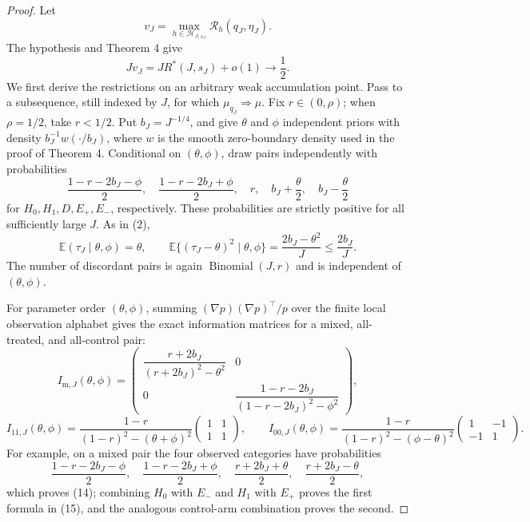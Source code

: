 \documentclass{article}
\begin{document}
\begin{proof}
Let
\[
 v_J=\max_{h\in\mathcal H_{J,s_J}}\mathcal R_h(q_J,\eta_J).
\]
The hypothesis and Theorem 4 give
\[
 Jv_J=J R^*(J,s_J)+o(1)\longrightarrow\frac12.
 \tag{11}
\]
We first derive the restrictions on an arbitrary weak accumulation point.  Pass to a subsequence, still indexed by \(J\), for which \(\mu_{q_J}\Rightarrow\mu\).  Fix \(r\in(0,\rho)\); when \(\rho=1/2\), take \(r<1/2\).  Put \(b_J=J^{-1/4}\), and give \(\theta\) and \(\phi\) independent priors with density \(b_J^{-1}w(\cdot/b_J)\), where \(w\) is the smooth zero-boundary density used in the proof of Theorem 4.  Conditional on \((\theta,\phi)\), draw pairs independently with probabilities
\[
 \frac{1-r-2b_J-\phi}{2},\quad
 \frac{1-r-2b_J+\phi}{2},\quad
 r,\quad
 b_J+\frac\theta2,\quad
 b_J-\frac\theta2
 \tag{12}
\]
for \(H_0,H_1,D,E_+,E_-\), respectively.  These probabilities are strictly positive for all sufficiently large \(J\).  As in (2),
\[
 \mathbb E(\tau_J\mid\theta,\phi)=\theta,
 \qquad
 \mathbb E\{(\tau_J-\theta)^2\mid\theta,\phi\}
 =\frac{2b_J-\theta^2}{J}\le\frac{2b_J}{J}.
 \tag{13}
\]
The number of discordant pairs is again \(\operatorname{Binomial}(J,r)\) and is independent of \((\theta,\phi)\).

For parameter order \((\theta,\phi)\), summing \((\nabla p)(\nabla p)^{\!\top}/p\) over the finite local observation alphabet gives the exact information matrices for a mixed, all-treated, and all-control pair:
\[
 I_{\mathrm m,J}(\theta,\phi)=
 \begin{pmatrix}
 \dfrac{r+2b_J}{(r+2b_J)^2-\theta^2}&0\\[5pt]
 0&\dfrac{1-r-2b_J}{(1-r-2b_J)^2-\phi^2}
 \end{pmatrix},
 \tag{14}
\]
\[
 I_{11,J}(\theta,\phi)=
 \frac{1-r}{(1-r)^2-(\theta+\phi)^2}
 \begin{pmatrix}1&1\\1&1\end{pmatrix},
 \qquad
 I_{00,J}(\theta,\phi)=
 \frac{1-r}{(1-r)^2-(\phi-\theta)^2}
 \begin{pmatrix}1&-1\\-1&1\end{pmatrix}.
 \tag{15}
\]
For example, on a mixed pair the four observed categories have probabilities
\[
 \frac{1-r-2b_J-\phi}{2},\quad
 \frac{1-r-2b_J+\phi}{2},\quad
 \frac{r+2b_J+\theta}{2},\quad
 \frac{r+2b_J-\theta}{2},
\]
which proves (14); combining \(H_0\) with \(E_-\) and \(H_1\) with \(E_+\) proves the first formula in (15), and the analogous control-arm combination proves the second.


\end{proof}
\end{document}
